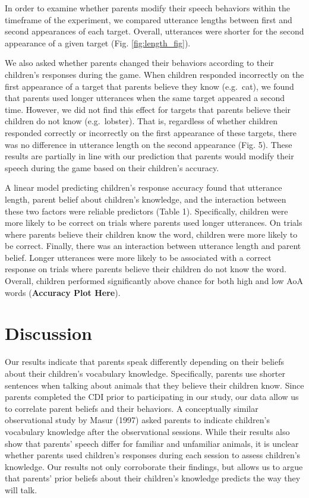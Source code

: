 \documentclass[10pt, letterpaper]{article}
\begin{document}
In order to examine whether parents modify their speech behaviors within
the timeframe of the experiment, we compared utterance lengths between
first and second appearances of each target. Overall, utterances were
shorter for the second appearance of a given target (Fig.
\ref{fig:length_fig}).

We also asked whether parents changed their behaviors according to their
children's responses during the game. When children responded
incorrectly on the first appearance of a target that parents believe
they know (e.g.~cat), we found that parents used longer utterances when
the same target appeared a second time. However, we did not find this
effect for targets that parents believe their children do not know
(e.g.~lobster). That is, regardless of whether children responded
correctly or incorrectly on the first appearance of these targets, there
was no difference in utterance length on the second appearance (Fig. 5).
These results are partially in line with our prediction that parents
would modify their speech during the game based on their children's
accuracy.

A linear model predicting children's response accuracy found that
utterance length, parent belief about children's knowledge, and the
interaction between these two factors were reliable predictors (Table
1). Specifically, children were more likely to be correct on trials
where parents used longer utterances. On trials where parents believe
their children know the word, children were more likely to be correct.
Finally, there was an interaction between utterance length and parent
belief. Longer utterances were more likely to be associated with a
correct response on trials where parents believe their children do not
know the word. Overall, children performed significantly above chance
for both high and low AoA words (\textbf{Accuracy Plot Here}).

\hypertarget{discussion}{%
\section{Discussion}\label{discussion}}

Our results indicate that parents speak differently depending on their
beliefs about their children's vocabulary knowledge. Specifically,
parents use shorter sentences when talking about animals that they
believe their children know. Since parents completed the CDI prior to
participating in our study, our data allow us to correlate parent
beliefs and their behaviors. A conceptually similar observational study
by Masur (1997) asked parents to indicate children's vocabulary
knowledge after the observational sessions. While their results also
show that parents' speech differ for familiar and unfamiliar animals, it
is unclear whether parents used children's responses during each session
to assess children's knowledge. Our results not only corroborate their
findings, but allows us to argue that parents' prior beliefs about their
children's knowledge predicts the way they will talk.
\end{document}
